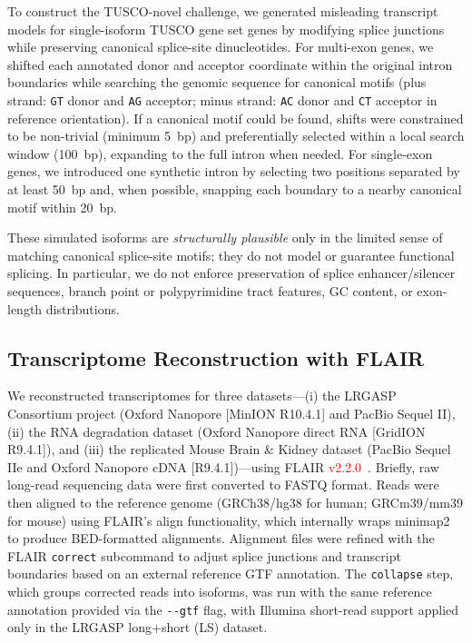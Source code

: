 \documentclass[pdflatex,sn-nature]{sn-jnl}%
\newcommand{\tuscoGeneSet}{TUSCO gene set}
\newcommand{\tuscoNovel}{TUSCO-novel}
\begin{document}
To construct the \tuscoNovel{} challenge, we generated misleading transcript models for single-isoform \tuscoGeneSet{} genes by modifying splice junctions while preserving canonical splice-site dinucleotides. For multi-exon genes, we shifted each annotated donor and acceptor coordinate within the original intron boundaries while searching the genomic sequence for canonical motifs (plus strand: \texttt{GT} donor and \texttt{AG} acceptor; minus strand: \texttt{AC} donor and \texttt{CT} acceptor in reference orientation). If a canonical motif could be found, shifts were constrained to be non-trivial (minimum 5~bp) and preferentially selected within a local search window (100~bp), expanding to the full intron when needed. For single-exon genes, we introduced one synthetic intron by selecting two positions separated by at least 50~bp and, when possible, snapping each boundary to a nearby canonical motif within 20~bp.

These simulated isoforms are \emph{structurally plausible} only in the limited sense of matching canonical splice-site motifs; they do not model or guarantee functional splicing. In particular, we do not enforce preservation of splice enhancer/silencer sequences, branch point or polypyrimidine tract features, GC content, or exon-length distributions.

\subsection{Transcriptome Reconstruction with FLAIR}

We reconstructed transcriptomes for three datasets---(i) the LRGASP Consortium project (Oxford Nanopore [MinION R10.4.1] and PacBio Sequel II), (ii) the RNA degradation dataset (Oxford Nanopore direct RNA [GridION R9.4.1]), and (iii) the replicated Mouse Brain \& Kidney dataset (PacBio Sequel IIe and Oxford Nanopore cDNA [R9.4.1])---using FLAIR \textcolor{red}{v2.2.0}~\cite{tang_detecting_2024}. Briefly, raw long-read sequencing data were first converted to FASTQ format. Reads were then aligned to the reference genome (GRCh38/hg38 for human; GRCm39/mm39 for mouse) using FLAIR's align functionality, which internally wraps minimap2 to produce BED-formatted alignments. Alignment files were refined with the FLAIR \texttt{correct} subcommand to adjust splice junctions and transcript boundaries based on an external reference GTF annotation. The \texttt{collapse} step, which groups corrected reads into isoforms, was run with the same reference annotation provided via the \texttt{-{}-gtf} flag, with Illumina short-read support applied only in the LRGASP long+short (LS) dataset.
\end{document}
